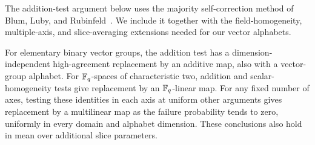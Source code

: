 The addition-test argument below uses the majority self-correction method
of Blum, Luby, and Rubinfeld~\cite[Generic Linear Self-Testing]{BLR1993}.
We include it together with the field-homogeneity, multiple-axis, and
slice-averaging extensions needed for our vector alphabets.

\begin{lemma}
\label{ib:axis-replacement}
For elementary binary vector groups, the addition test has a
dimension-independent high-agreement replacement by an additive map,
also with a vector-group alphabet.  For \(\mathbb{F}_q\)-spaces of
characteristic two, addition and scalar-homogeneity tests give
replacement by an \(\mathbb{F}_q\)-linear map.  For any fixed number of axes,
testing these identities in each axis at uniform other arguments gives
replacement by a multilinear map as the failure probability tends to
zero, uniformly in every domain and alphabet dimension.  These
conclusions also hold in mean over additional slice parameters.
\end{lemma}

